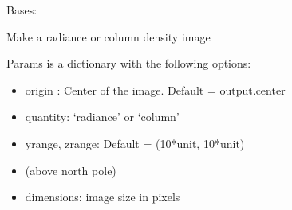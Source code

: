 \documentclass[letterpaper,10pt,english]{sphinxmanual}
\begin{document}
\begin{fulllineitems}
\label{\detokenize{nexoclom2/nexoclom2.data_simulation.ModelImage:nexoclom2.data_simulation.ModelImage.ModelImage}}
\pysigstartsignatures
\pysiglinewithargsret
{}
{\sphinxparamcomma {}\sphinxparamcomma {}\sphinxparamcomma {}}
{}
\pysigstopsignatures
\sphinxAtStartPar
Bases: {\hyperref[\detokenize{nexoclom2/nexoclom2.data_simulation.ModelResult:nexoclom2.data_simulation.ModelResult.ModelResult}]{}}

\sphinxAtStartPar
Make a radiance or column density image

\sphinxAtStartPar
Params is a dictionary with the following options:
\begin{itemize}
\item {} 
\sphinxAtStartPar
origin : Center of the image. Default = output.center

\item {} 
\sphinxAtStartPar
quantity: ‘radiance’ or ‘column’

\item {} 
\sphinxAtStartPar
yrange, zrange: Default = (\sphinxhyphen{}10*unit, 10*unit)

\item {} \begin{description}
\sphinxAtStartPar
(above north pole)

\end{description}

\item {} 
\sphinxAtStartPar
dimensions: image size in pixels

\end{itemize}
\begin{quote}\begin{description}
\begin{description}
\end{description}


\end{description}
\end{quote}
\end{fulllineitems}
\end{document}
